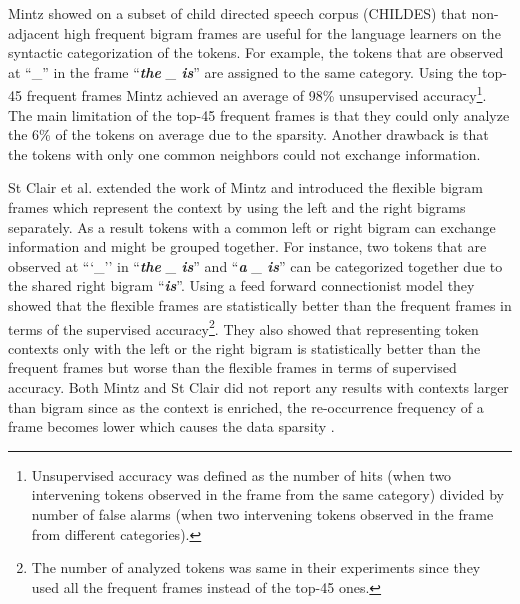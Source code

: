 Mintz  showed on a subset of child
directed speech corpus (CHILDES) \cite{macwhinney2000childes} that
non-adjacent high frequent bigram frames are useful for the language
learners on the syntactic categorization of the tokens.  For example,
the tokens that are observed at ``\_'' in the frame ``{\em {\bf the} \_
  {\bf is}}'' are assigned to the same category.  Using the top-45
frequent frames Mintz achieved an average of 98\% unsupervised
accuracy\footnote{Unsupervised accuracy was defined as the number of
  hits (when two intervening tokens observed in the frame from the
  same category) divided by number of false alarms (when two
  intervening tokens observed in the frame from different
  categories).}.  The main limitation of the top-45 frequent frames is
that they could only analyze the 6\% of the tokens on average due to
the sparsity.  Another drawback is that the tokens with only one
common neighbors could not exchange information.

St Clair et al.   extended the work of Mintz
 and introduced the flexible bigram
frames which represent the context by using the left and the right
bigrams separately.  As a result tokens with a common left or right
bigram can exchange information and might be grouped together.  For
instance, two tokens that are observed at ```\_'' in ``{\em {\bf the}
  \_ {\bf is}}'' and ``{\em {\bf a} \_ {\bf is}}'' can be categorized
together due to the shared right bigram ``{\em{\bf is}}''.  Using a
feed forward connectionist model they showed that the flexible frames
are statistically better than the frequent frames in terms of the
supervised accuracy\footnote{The number of analyzed tokens was same in
  their experiments since they used all the frequent frames instead of
  the top-45 ones.}.  They also showed that representing token
contexts only with the left or the right bigram is statistically
better than the frequent frames but worse than the flexible frames in
terms of supervised accuracy.  Both Mintz
 and St Clair  did
not report any results with contexts larger than bigram since as the
context is enriched, the re-occurrence frequency of a frame becomes
lower which causes the data sparsity \cite{manning99foundations}.

